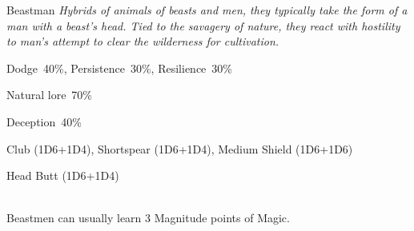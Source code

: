 \begin{monsterbox}{Beastman}
	\textit{Hybrids of animals of beasts and men, they typically take the form of a man with a beast’s head. Tied to the savagery of nature, they react with hostility to man’s attempt to clear the wilderness for cultivation.  }\\
	\rpghline
	\basics[%
        hitpoints  = 16,
	majorwound = 8,
	damagemodifier = +1D4,
	powerpoints = 11,
	movementrate = 15m,
	armor = Leather (2AP),
	plunderrating = 2
	]
	\rpghline%
	\stats[ %
		STR = 2D6+6  (13),
		CON = 1D6+12 (16),
		DEX = 3D6    (11),
		SIZ = 1D6+12 (16),
		INT = 2D6+6  (13),
		POW = 3D6    (11),
		CHA = 2D6    (7)
	]
	\rpghline%
	\begin{rpg-monsteraction}[Resistances]
		Dodge~40\%, Persistence~30\%, Resilience~30\%
	\end{rpg-monsteraction}
	\begin{rpg-monsteraction}[Knowledge]
    		Natural lore~70\%
	\end{rpg-monsteraction}
	\begin{rpg-monsteraction}[Practical]
		Deception~40\%
	\end{rpg-monsteraction}
	\begin{rpg-monsteraction}
		Club (1D6+1D4), Shortspear (1D6+1D4), Medium Shield (1D6+1D6)
	\end{rpg-monsteraction}
	\begin{rpg-monsteraction}
		Head Butt (1D6+1D4)
	\end{rpg-monsteraction}
	\begin{rpg-monsteraction}[Supernatural]\\
		Beastmen can usually learn 3 Magnitude points of Magic.
	\end{rpg-monsteraction}

\end{monsterbox}




